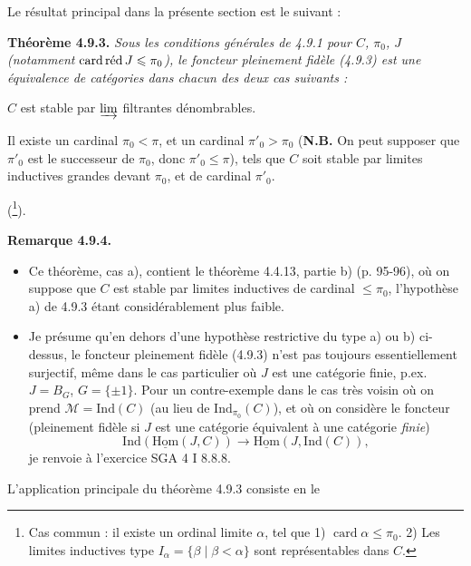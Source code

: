 \documentclass[11pt]{article}
\newcommand{\printedpage}[1]{\marginpar{\footnotesize p.~#1}}
\newcommand{\msp}[1]{\marginpar{\footnotesize [#1]}}
\newcommand{\uHom}{\underline{\mathrm{Hom}}}
\newcommand{\Ind}{\mathrm{Ind}}
\newcommand{\card}{\operatorname{card}}
\newcommand{\cardred}{\mathop{\textup{card\,réd}}\nolimits}
\newcommand{\cM}{\mathcal{M}}
\begin{document}
\printedpage{79}

Le résultat principal dans la présente section est le suivant :

\textbf{Théorème 4.9.3.} \textit{Sous les conditions générales de 4.9.1 pour $C$, $\pi_0$, $J$ (notamment} $\cardred J \leqslant \pi_0$\textit{), le foncteur pleinement fidèle (4.9.3) est une équivalence de catégories dans chacun des deux cas suivants :}
\begin{itemize}[label={}]
{\itshape
\item[a)] $C$ est stable par $\varinjlim$ filtrantes dénombrables.
\item[b)] Il existe un cardinal $\pi_0 < \pi$, et un cardinal $\pi'_0 > \pi_0$ \textup{(}\textbf{\upshape N.B.} On peut supposer que $\pi'_0$ est le successeur de $\pi_0$, donc $\pi'_0 \leqslant \pi$), tels que $C$ soit stable par limites inductives grandes devant $\pi_0$, et de cardinal $\pi'_0$.
}
\end{itemize}
(\footnote[94]{Cas commun : il existe un ordinal limite $\alpha$, tel que 1) $\card \alpha \leqslant \pi_0$. 2) Les limites inductives type $I_\alpha = \{\beta \mid \beta < \alpha\}$ sont représentables dans $C$.}).

\textbf{Remarque 4.9.4.}
\begin{itemize}[label={}]
\item[a)] Ce théorème, cas a), contient le théorème 4.4.13, partie b) (p. 95-96), où on suppose que $C$ est stable par limites inductives de cardinal $\leqslant \pi_0$, l'hypothèse a) de 4.9.3 étant considérablement plus faible.
\item[b)] \msp{page 220}Je présume qu'en dehors d'une hypothèse restrictive du type a) ou b) ci-dessus, le foncteur pleinement fidèle (4.9.3) n'est pas toujours essentiellement surjectif, même dans le cas particulier où $J$ est une catégorie finie, p.ex. $J = B_G$, $G = \{\pm 1\}$. Pour un contre-exemple dans le cas très voisin où on prend $\cM = \Ind(C)$ (au lieu de $\Ind_{\pi_0}(C)$), et où on considère le foncteur (pleinement fidèle si $J$ est une catégorie équivalent à une catégorie \textit{finie}) %
\[
\Ind(\uHom(J,C)) \longrightarrow \uHom(J,\Ind(C)),
\]
je renvoie à l'exercice SGA 4 I 8.8.8.
\end{itemize}
L'application principale du théorème 4.9.3 consiste en le
\end{document}
